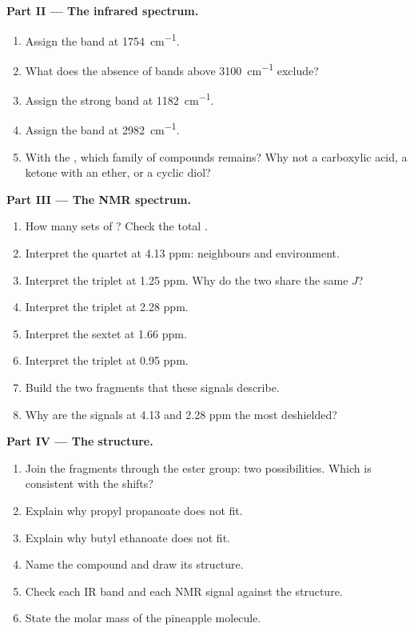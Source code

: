 \begin{problem}
\medskip
\noindent\textbf{Part II --- The infrared spectrum.}
\begin{enumerate}[resume]
  \item Assign the band at \qty{1754}{cm^{-1}}.
  \item What does the absence of bands above \qty{3100}{cm^{-1}} exclude?
  \item Assign the strong band at \qty{1182}{cm^{-1}}.
  \item Assign the band at \qty{2982}{cm^{-1}}.
  \item With the , which family of compounds
        remains? Why not a carboxylic acid, a ketone with an ether, or a
        cyclic diol?
\end{enumerate}

\medskip
\noindent\textbf{Part III --- The NMR spectrum.}
\begin{enumerate}[resume]
  \item How many sets of ? Check the total .
  \item Interpret the quartet at 4.13 ppm: neighbours and environment.
  \item Interpret the triplet at 1.25 ppm. Why do the two share the same
        $J$?
  \item Interpret the triplet at 2.28 ppm.
  \item Interpret the sextet at 1.66 ppm.
  \item Interpret the triplet at 0.95 ppm.
  \item Build the two fragments that these signals describe.
  \item Why are the signals at 4.13 and 2.28 ppm the most deshielded?
\end{enumerate}

\medskip
\noindent\textbf{Part IV --- The structure.}
\begin{enumerate}[resume]
  \item Join the fragments through the ester group: two possibilities.
        Which is consistent with the shifts?
  \item Explain why propyl propanoate does not fit.
  \item Explain why butyl ethanoate does not fit.
  \item Name the compound and draw its structure.
  \item Check each IR band and each NMR signal against the structure.
  \item State the molar mass of the pineapple molecule.
\end{enumerate}
\end{problem}
